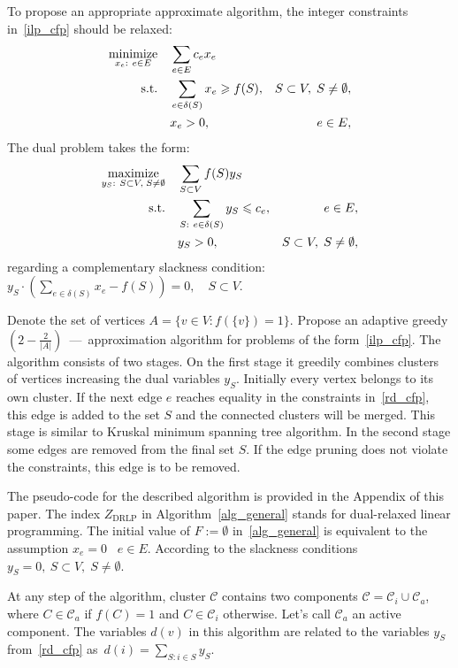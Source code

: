 \documentclass[12pt]{article}
\begin{document}
To propose an appropriate approximate algorithm, the integer constraints in~\eqref{ilp_cfp} should be relaxed:
\begin{align}
\underset{x_e:~e\in E}{\text{minimize}}\quad & \sum\limits_{e\in E}c_ex_e \nonumber\\
\text{s.t.\quad} & \sum\limits_{e\in \delta(S)}x_e\geqslant f(S), & S \subset V, \; S \not= \emptyset,
\label{rlp_cfp}\\
& x_e>0, & e\in E,\nonumber
\end{align}
The dual problem takes the  form:
\begin{align}
\underset{y_S:~S \subset V, \; S \not= \emptyset}{\text{maximize}}\quad & \sum\limits_{S\subset V}f(S)y_S \nonumber\\
\text{s.t.\quad} & \sum\limits_{S:~e\in \delta(S)}y_S\leqslant c_e, & e\in E,
\label{rd_cfp}\\
& y_S>0, &S \subset V, \; S \not= \emptyset,\nonumber
\end{align}
regarding a complementary slackness condition:
$
y_S\cdot \left(\sum\limits_{e\in \delta(S)}x_e - f(S)\right) = 0, \quad S\subset V.
$%

Denote the set of vertices $A=\{v\in V: f(\{v\})=1\}$. Propose an adaptive greedy $\left(2-\frac{2}{|A|}\right)$~---~approximation algorithm for problems of the form~\eqref{ilp_cfp}. The algorithm consists of two stages. On the first stage it greedily combines clusters of vertices increasing the dual variables $y_S$. Initially every vertex belongs to its own cluster. If the next edge $e$ reaches equality in the constraints in~\eqref{rd_cfp}, this edge is added to the set $S$ and the connected clusters will be merged. This stage is similar to Kruskal minimum spanning tree algorithm. %
In the second stage some edges are removed from the final set $S$. If the edge pruning does not violate the constraints, this edge is to be removed.

The pseudo-code for the described algorithm is provided in the Appendix of this paper. The index $Z_{\text{DRLP}}$ in Algorithm~\ref{alg_general} stands for dual-relaxed linear programming. The initial value of $F:=\emptyset$ in~\ref{alg_general} is equivalent to the assumption $x_e = 0 \;\;\; e \in E$. According to the slackness conditions $y_S = 0,~ S \subset V, \; S \not= \emptyset$.

At any step of the algorithm, cluster $\mathcal{C}$ contains two components $\mathcal{C} = \mathcal{C}_i \cup \mathcal{C}_a$, where $C\in\mathcal{C}_a$ if $f(C) = 1$ and $C\in\mathcal{C}_i$ otherwise. Let's call $\mathcal{C}_a$ an active component.
The variables $d(v)$ in this algorithm are related to the variables $y_S$ from~\eqref{rd_cfp} as~$d(i) = \sum\limits_{S:i\in S}y_S.$ %
\end{document}
